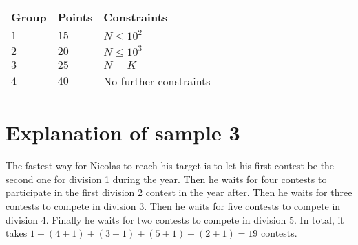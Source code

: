 \noindent
\begin{tabular}{| l | l | l |}
\hline
Group & Points & Constraints \\ \hline
$1$    & $15$         & $N \leq 10^2$ \\ \hline
$2$    & $20$         & $N \leq 10^3$ \\ \hline
$3$    & $25$         & $N = K$ \\ \hline
$4$    & $40$         & No further constraints\\ \hline
\end{tabular}

\section*{Explanation of sample 3}
The fastest way for Nicolas to reach his target is to let his first contest be the second one for division 1 during the year.
Then he waits for four contests to participate in the first division 2 contest in the year after.
Then he waits for three contests to compete in division 3.
Then he waits for five contests to compete in division 4.
Finally he waits for two contests to compete in division 5.
In total, it takes $1+(4+1)+(3+1)+(5+1)+(2+1) = 19$ contests.

